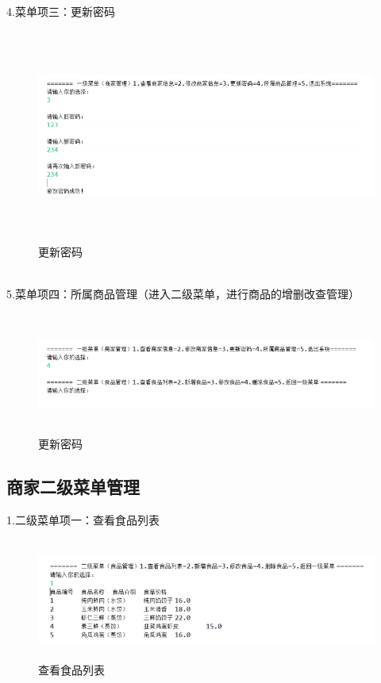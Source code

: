 4.菜单项三：更新密码

\begin{figure}[H]
    \centering
    \includegraphics[width=15cm,height=7cm]{figures/jdbc9.png}
    \caption{更新密码}
\end{figure}~\\

5.菜单项四：所属商品管理（进入二级菜单，进行商品的增删改查管理）

\begin{figure}[H]
    \centering
    \includegraphics[width=15cm,height=4cm]{figures/jdbc10.png}
    \caption{更新密码}
\end{figure}


\subsection{商家二级菜单管理}
1.二级菜单项一：查看食品列表

\begin{figure}[H]
    \centering
    \includegraphics[width=15cm,height=4cm]{figures/jdbc11.png}
    \caption{查看食品列表}
\end{figure}

